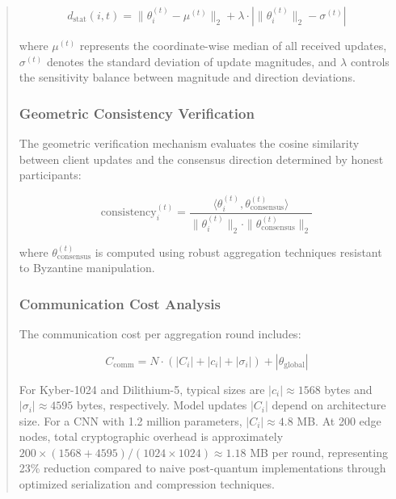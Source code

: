 \documentclass{svproc}
\begin{document}
\begin{abstract}
\begin{equation}
d_{\text{stat}}(i, t) = \|\theta_i^{(t)} - \mu^{(t)}\|_2 + \lambda \cdot |\|\theta_i^{(t)}\|_2 - \sigma^{(t)}|
\end{equation}

where $\mu^{(t)}$ represents the coordinate-wise median of all received updates, $\sigma^{(t)}$ denotes the standard deviation of update magnitudes, and $\lambda$ controls the sensitivity balance between magnitude and direction deviations.

\subsubsection{Geometric Consistency Verification}

The geometric verification mechanism evaluates the cosine similarity between client updates and the consensus direction determined by honest participants:

\begin{equation}
\text{consistency}_i^{(t)} = \frac{\langle \theta_i^{(t)}, \theta_{\text{consensus}}^{(t)} \rangle}{\|\theta_i^{(t)}\|_2 \cdot \|\theta_{\text{consensus}}^{(t)}\|_2}
\end{equation}

where $\theta_{\text{consensus}}^{(t)}$ is computed using robust aggregation techniques resistant to Byzantine manipulation.

\subsubsection{Communication Cost Analysis}

The communication cost per aggregation round includes:

\begin{equation}
C_{\text{comm}} = N \cdot (|C_i| + |c_i| + |\sigma_i|) + |\theta_{\text{global}}|
\end{equation}

For Kyber-1024 and Dilithium-5, typical sizes are $|c_i| \approx 1568$ bytes and $|\sigma_i| \approx 4595$ bytes, respectively. Model updates $|C_i|$ depend on architecture size. For a CNN with 1.2 million parameters, $|C_i| \approx 4.8$ MB. At 200 edge nodes, total cryptographic overhead is approximately $200 \times (1568 + 4595) / (1024 \times 1024) \approx 1.18$ MB per round, representing 23\% reduction compared to naive post-quantum implementations through optimized serialization and compression techniques.


\end{abstract}
\end{document}
